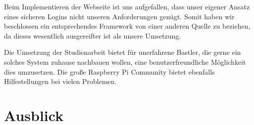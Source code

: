 	Beim Implementieren der Webseite ist uns aufgefallen, dass unser eigener Ansatz eines sicheren Logins nicht unseren Anforderungen genügt. Somit haben wir beschlossen ein entsprechendes Framework von einer anderen Quelle zu beziehen, da dieses wesentlich ausgereifter ist als unsere Umsetzung. 
	
	Die Umsetzung der Studienarbeit bietet für unerfahrene Bastler, die gerne ein solches System zuhause nachbauen wollen, eine benutzerfreundliche Möglichkeit dies umzusetzen. Die große Raspberry Pi Community bietet ebenfalls Hilfestellungen bei vielen Problemen.
	
\section{Ausblick}
	
